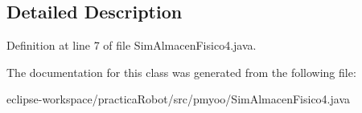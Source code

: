 \subsection{Detailed Description}


Definition at line 7 of file Sim\+Almacen\+Fisico4.\+java.



The documentation for this class was generated from the following file\+:\begin{DoxyCompactItemize}
\item 
eclipse-\/workspace/practica\+Robot/src/pmyoo/Sim\+Almacen\+Fisico4.\+java\end{DoxyCompactItemize}
